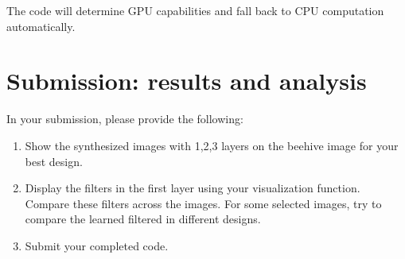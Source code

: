 \documentclass[11pt]{article}
\begin{document}
The code will determine GPU capabilities and fall back to CPU computation automatically.


\section{Submission: results and analysis}

In your submission, please provide the following:
\begin{enumerate}
    \item Show the synthesized images with 1,2,3 layers on the beehive image for your best design.
    \item Display the filters in the first layer using your visualization function. Compare these filters across the images. For some selected images, try to compare the learned filtered in different designs.
    \item Submit your completed code.
\end{enumerate}
\end{document}
